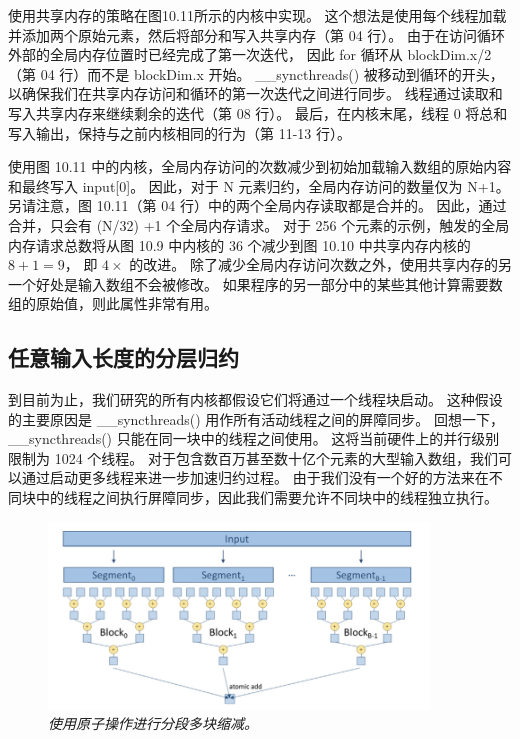 使用共享内存的策略在图10.11所示的内核中实现。 
这个想法是使用每个线程加载并添加两个原始元素，然后将部分和写入共享内存（第 04 行）。 
由于在访问循环外部的全局内存位置时已经完成了第一次迭代，
因此 for 循环从 blockDim.x/2 （第 04 行）而不是 blockDim.x 开始。 
\_\_syncthreads() 被移动到循环的开头，以确保我们在共享内存访问和循环的第一次迭代之间进行同步。 
线程通过读取和写入共享内存来继续剩余的迭代（第 08 行）。 
最后，在内核末尾，线程 0 将总和写入输出，保持与之前内核相同的行为（第 11-13 行）。

使用图 10.11 中的内核，全局内存访问的次数减少到初始加载输入数组的原始内容和最终写入 input[0]。 
因此，对于 N 元素归约，全局内存访问的数量仅为 N+1。 另请注意，图 10.11（第 04 行）中的两个全局内存读取都是合并的。 
因此，通过合并，只会有 (N/32) +1 个全局内存请求。 
对于 256 个元素的示例，触发的全局内存请求总数将从图 10.9 中内核的 36 个减少到图 10.10 中共享内存内核的 $8+1 = 9$，
即 $4\times$ 的改进。 除了减少全局内存访问次数之外，使用共享内存的另一个好处是输入数组不会被修改。 
如果程序的另一部分中的某些其他计算需要数组的原始值，则此属性非常有用。

\subsection{任意输入长度的分层归约}
到目前为止，我们研究的所有内核都假设它们将通过一个线程块启动。 
这种假设的主要原因是 \_\_syncthreads() 用作所有活动线程之间的屏障同步。 
回想一下，\_\_syncthreads() 只能在同一块中的线程之间使用。 这将当前硬件上的并行级别限制为 1024 个线程。 
对于包含数百万甚至数十亿个元素的大型输入数组，我们可以通过启动更多线程来进一步加速归约过程。 
由于我们没有一个好的方法来在不同块中的线程之间执行屏障同步，因此我们需要允许不同块中的线程独立执行。

\begin{figure}[H]
	\centering
	\includegraphics[width=0.9\textwidth]{figs/F10.12.png}
	\caption{\textit{使用原子操作进行分段多块缩减。}}
\end{figure}

